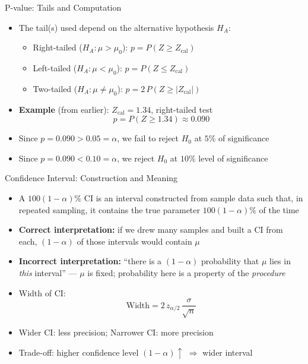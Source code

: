 \documentclass[12pt, aspectratio=169]{beamer}
\begin{document}
    \begin{frame}{P-value: Tails and Computation}
        \begin{itemize}
            \item The tail(s) used depend on the alternative hypothesis $H_A$:
            \begin{itemize}
                \item Right-tailed ($H_A: \mu > \mu_0$):
                \quad $p = P(Z \geq Z_{\text{cal}})$
                \item Left-tailed ($H_A: \mu < \mu_0$):
                \quad $p = P(Z \leq Z_{\text{cal}})$
                \item Two-tailed ($H_A: \mu \neq \mu_0$):
                \quad $p = 2\,P(Z \geq |Z_{\text{cal}}|)$
            \end{itemize}
            \item \textbf{Example} (from earlier): $Z_{\text{cal}} = 1.34$,\;
                right-tailed test
            \[
                p = P(Z \geq 1.34) \approx 0.090
            \]
            \item Since $p = 0.090 > 0.05 = \alpha$, we fail to reject $H_0$ at \(5\%\) of significance
            \item Since $p = 0.090 < 0.10 = \alpha$, we reject $H_0$ at \(10\%\) level of significance
        \end{itemize}
    \end{frame}


    \begin{frame}{Confidence Interval: Construction and Meaning}
        \begin{itemize}
            \item A $100(1-\alpha)\%$ CI is an interval constructed from sample data
                such that, in repeated sampling, it contains the true parameter
                $100(1-\alpha)\%$ of the time
            \item \textbf{Correct interpretation:} if we drew many samples and built a CI
                from each, $(1-\alpha)$ of those intervals would contain $\mu$
            \item \textbf{Incorrect interpretation:} ``there is a $(1-\alpha)$ probability
                that $\mu$ lies in \emph{this} interval'' ---
                $\mu$ is fixed; probability here is a property of the \emph{procedure}
            \item Width of CI:
            \[
                \text{Width} = 2\,z_{\alpha/2}\,\frac{\sigma}{\sqrt{n}}
            \]
            \item Wider CI: less precision; Narrower CI: more precision
            \item Trade-off: higher confidence level $(1-\alpha)\uparrow$
                $\Rightarrow$ wider interval
        \end{itemize}
    \end{frame}
\end{document}
